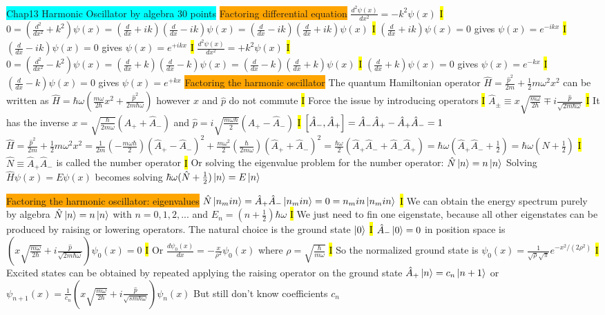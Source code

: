 \documentclass[fontsize=4pt]{scrartcl}
\begin{document}
\colorbox{Cyan}{Chap13 Harmonic Oscillator by algebra 30 points}
\colorbox{Orange}{Factoring differential equation}
$\frac{d^2 \psi(x)}{dx^2} = -k^2 \psi (x)$
\hl{I}
$0 = (\frac{d^2}{dx^2}+k^2)\psi(x) = (\frac{d}{dx} + ik)(\frac{d}{dx} - ik)\psi(x) = (\frac{d}{dx} - ik)(\frac{d}{dx} + ik)\psi(x)$
\hl{I}
$(\frac{d}{dx} + ik)\psi(x) = 0 $ gives $\psi(x) = e^{-ikx}$
\hl{I}
$(\frac{d}{dx} - ik)\psi(x) = 0$ gives $\psi(x) = e^{+ikx}$
\hl{I}
$\frac{d^2 \psi(x)}{dx^2} = +k^2 \psi(x)$
\hl{I}
$0 = (\frac{d^2}{dx^2}-k^2)\psi(x) = (\frac{d}{dx} + k)(\frac{d}{dx} - k)\psi(x) = (\frac{d}{dx} - k)(\frac{d}{dx} + k)\psi(x)$
\hl{I}
$(\frac{d}{dx} + k)\psi(x) = 0 $ gives $\psi(x) = e^{-kx}$
\hl{I}
$(\frac{d}{dx} - k)\psi(x) = 0$ gives $\psi(x) = e^{+kx}$
\colorbox{Orange}{Factoring the harmonic oscillator}
The quantum Hamiltonian operator
$\hat{H} = \frac{\hat{p}^2}{2m} + \frac{1}{2} m\omega^2 x^2$ can be written as $\hat{H} = \hbar \omega (\frac{m\omega}{2\hbar}x^2 + \frac{\hat{p}^2}{2m\hbar \omega})$ however $x$ and $\hat{p}$ do not commute
\hl{I}
Force the issue by introducing operators
\hl{I}
$\hat{A}_{\pm} \equiv x\sqrt{\frac{m\omega}{2\hbar}} \mp i \frac{\hat{p}}{\sqrt{2m\hbar \omega}} $
\hl{I}
It has the inverse $x=\sqrt{\frac{\hbar}{2m\omega}}(\hat{A}_+ + \hat{A}_-)$ and $\hat{p} =  i\sqrt{\frac{m\omega \hbar}{2}}(\hat{A}_+ - \hat{A}_-)$
\hl{I}
$\comm{\hat{A}_-}{\hat{A}_+} = \hat{A}_- \hat{A}_+ - \hat{A}_+ \hat{A}_- = 1$
$\hat{H} = \frac{\hat{p}^2}{2m} + \frac{1}{2} m\omega^2 x^2 = \frac{1}{2m} (-\frac{m\omega \hbar}{2})(\hat{A}_+  - \hat{A}_-)^2 + \frac{m\omega^2}{2}(\frac{\hbar}{2m\omega})(\hat{A}_+  + \hat{A}_-)^2 = \frac{\hbar \omega}{2}(\hat{A}_+ \hat{A}_- + \hat{A}_-  \hat{A}_+) = \hbar \omega (\hat{A}_+ \hat{A}_- + \frac{1}{2}) = \hbar \omega (\hat{N} + \frac{1}{2}) $
\hl{I}
$\hat{N} \equiv \hat{A}_+  \hat{A}_-$ is called the number operator
\hl{I}
Or solving the eigenvalue problem for the number operator: $\hat{N}\ket{n} = n\ket{n}$
Solving $\hat{H}\psi(x) = E\psi(x)$ becomes solving $\hbar \omega (\hat{N}+ \frac{1}{2})\ket{n} = E\ket{n}$

\colorbox{Orange}{Factoring the harmonic oscillator: eigenvalues}
$\hat{N}\ket{n_min} =  \hat{A}_+  \hat{A}_- \ket{n_min} = 0 = n_min \ket{n_min}$
\hl{I}
We can obtain the energy spectrum purely by algebra
$\hat{N}\ket{n} = n\ket{n}$ with $n=0,1,2,...$ and $E_n = (n+\frac{1}{2})\hbar \omega$
\hl{I}
We just need to fin one eigenstate, because all other eigenstates can be produced by raising or lowering operators. The natural choice is the ground state $\ket{0}$
\hl{I}
$\hat{A}_{-} \ket{0} = 0$ in position space is $(x\sqrt{\frac{m\omega}{2\hbar}} + i\frac{\hat{p}}{\sqrt{2m\hbar \omega}})\psi_0(x) = 0$
\hl{I}
Or $\frac{d\psi_0 (x)}{dx} = -\frac{x}{\rho^2}\psi_0 (x)$ where $\rho = \sqrt{\frac{\hbar}{m\omega}}$
\hl{I}
So the normalized ground state is $\psi_0(x) = \frac{1}{\sqrt{\rho}\sqrt{\pi}}e^{-x^2 / (2\rho^2)}$
\hl{I}
Excited states can be obtained by repeated applying the raising operator on the ground state
$\hat{A}_+ \ket{n} = c_n \ket{n+1}$ or $\psi_{n+1}(x) = \frac{1}{c_n}(x\sqrt{\frac{m\omega}{2\hbar}} + i \frac{\hat{p}}{\sqrt{sm\hbar \omega}})\psi_n (x)$
But still don't know coefficients $c_n$
\end{document}
